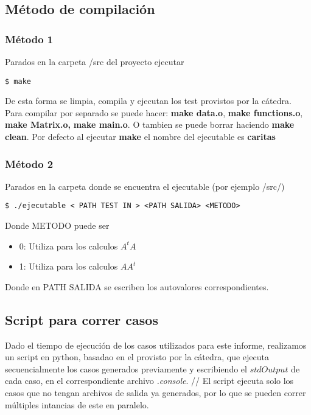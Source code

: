 \subsection{M\'etodo de compilaci\'on}

\subsubsection{M\'etodo 1}
\begin{framed}
Parados en la carpeta /src del proyecto ejecutar 
\begin{verbatim}
$ make
\end{verbatim}
De esta forma se limpia, compila y ejecutan los test provistos por la c\'atedra.
Para compilar por separado se puede hacer:  \textbf{make data.o}, \textbf{make functions.o}, \textbf{make Matrix.o,} \textbf{make main.o}. O tambien se puede borrar haciendo \textbf{make clean}. Por defecto al ejecutar \textbf{make} el nombre del ejecutable es \textbf{caritas}
\end{framed}

\subsubsection{M\'etodo 2}
\begin{framed}
Parados en la carpeta donde se encuentra el ejecutable (por ejemplo /src/) 
\begin{verbatim}
$ ./ejecutable < PATH TEST IN > <PATH SALIDA> <METODO>
\end{verbatim}
Donde METODO puede ser 
\begin{itemize}
	\item 0: Utiliza para los calculos $A^tA$
	\item 1: Utiliza para los calculos $AA^t$
\end{itemize}
Donde en PATH SALIDA se escriben los autovalores correspondientes.
\end{framed}

\subsection{Script para correr casos}
Dado el tiempo de ejecuci\'on de los casos utilizados para este informe, realizamos un script en python, basadao en el provisto por la c\'atedra, que ejecuta secuencialmente los casos generados previamente y escribiendo el $stdOutput$ de cada caso, en el correspondiente archivo \emph{.console}. //
El script ejecuta solo los casos que no tengan archivos de salida ya generados, por lo que se pueden correr m\'ultiples intancias de este en paralelo.

